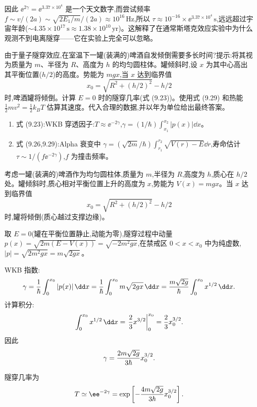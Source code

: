 \begin{question}
\begin{solution}
因此 $\ee^{2\gamma}=\ee^{3.37\times10^4}$ 是一个天文数字,而尝试频率 $f\sim v/(2a)\sim\sqrt{2E_1/m}/(2a)\approx 10^{16}\,\mathrm{Hz}$,所以 $\tau\approx 10^{-16}\times \ee^{3.37\times10^4}\,\mathrm{s}$,远远超过宇宙年龄($\sim4.35\times10^{17}\,\mathrm{s}\approx1.38\times10^{10}\,\mathrm{yr}$)。这解释了在通常斯塔克效应实验中为什么观测不到电离隧穿——它在实验上完全可以忽略。
\end{solution}
\end{question}

\begin{question}
由于量子隧穿效应,在室温下一罐(装满的)啤酒自发倾倒需要多长时间?提示:将其视为质量为 $m$、半径为 $R$、高度为 $h$ 的均匀圆柱体。罐倾斜时,设 $x$ 为其中心高出其平衡位置($h/2$)的高度。势能为 $mgx$,当 $x$ 达到临界值
\[
x_0=\sqrt{R^2+(h/2)^2}-h/2
\]
时,啤酒罐将倾倒。计算 $E=0$ 时的隧穿几率(式 (9.23))。使用式 (9.29) 和热能 $\frac12mv^2=\frac12k_BT$ 估算其速度。代入合理的数据,并以年为单位给出最终答案。

\par\smallskip
{}
\begin{enumerate}[leftmargin=2.2em,itemsep=0.12em,topsep=0.12em,parsep=0pt]
\item 式 (9.23):WKB 穿透因子:$T\approx \ee^{-2\gamma}$,$\gamma=(1/\hbar)\int_{x_1}^{x_2}|p(x)|\dd x$。
\item 式 (9.26,9.29):Alpha 衰变中 $\gamma=(\sqrt{2m}/\hbar)\int_{r_1}^{r_2}\sqrt{V(r)-E}\dd r$,寿命估计 $\tau\sim 1/(f \ee^{-2\gamma})$,$f$ 为撞击频率。
\end{enumerate}

\begin{solution}
考虑一罐(装满的)啤酒作为均匀圆柱体,质量为 $m$,半径为 $R$,高度为 $h$,质心在 $h/2$ 处。罐倾斜时,质心相对平衡位置上升的高度为 $x$,势能为 $V(x)=mgx$。当 $x$ 达到临界值
\[
x_0=\sqrt{R^2+(h/2)^2}-h/2
\]
时,罐将倾倒(质心越过支撑边缘)。

取 $E=0$(罐在平衡位置静止,动能为零),隧穿过程中动量 $p(x)=\sqrt{2m(E-V(x))}=\sqrt{-2m^2gx}$,在禁戒区 $0<x<x_0$ 中为纯虚数,$|p|=\sqrt{2m^2gx}=m\sqrt{2gx}$。

WKB 指数:
\[
\gamma={1\over\hbar}\int_0^{x_0}|p(x)|\,\dd x
={1\over\hbar}\int_0^{x_0}m\sqrt{2gx}\,\dd x
={m\sqrt{2g}\over\hbar}\int_0^{x_0}x^{1/2}\,\dd x.
\]
计算积分:
\[
\int_0^{x_0}x^{1/2}\,\dd x=\left.{2\over3}x^{3/2}\right|_0^{x_0}={2\over3}x_0^{3/2}.
\]
因此
\[
\gamma={2m\sqrt{2g}\over3\hbar}x_0^{3/2}.
\]

隧穿几率为
\[
T\simeq \ee^{-2\gamma}
=\exp\left[-{4m\sqrt{2g}\over3\hbar}x_0^{3/2}\right].
\]


\end{solution}
\end{question}
